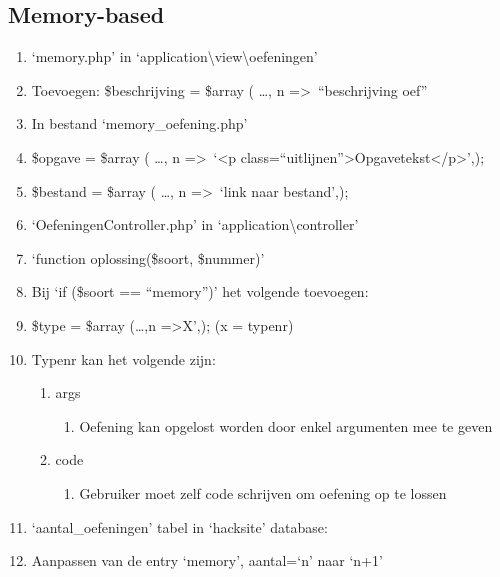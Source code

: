 \subsection{Memory-based} 
\begin{enumerate}
\item `memory.php' in `application\textbackslash view\textbackslash oefeningen'
\item Toevoegen: \$beschrijving = \$array ( \ldots , n =\textgreater ~``beschrijving oef''
\item In bestand `memory\_oefening.php'
\item \$opgave = \$array ( \ldots , n =\textgreater ~`\textless p class=``uitlijnen''\textgreater Opgavetekst\textless /p\textgreater',);
\item \$bestand = \$array ( \ldots , n =\textgreater ~`link naar bestand',);
\item `OefeningenController.php' in `application\textbackslash controller'
\item `function oplossing(\$soort, \$nummer)'
\item Bij `if (\$soort == ``memory'')' het volgende toevoegen:
\item \$type = \$array (\ldots ,n =\textgreater X',); (x = typenr)
\item Typenr kan het volgende zijn:
	\begin{enumerate}
	\item args
		\begin{enumerate}
		\item Oefening kan opgelost worden door enkel argumenten mee te geven
		\end{enumerate}
	\item code
		\begin{enumerate}
		\item Gebruiker moet zelf code schrijven om oefening op te lossen
		\end{enumerate}
	\end{enumerate}
\item `aantal\_oefeningen' tabel in `hacksite' database:
\item Aanpassen van de entry `memory', aantal=`n' naar `n+1'
\end{enumerate}

